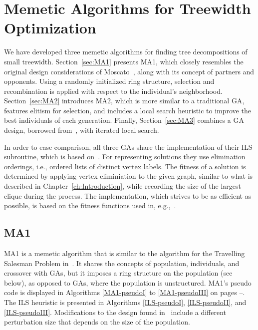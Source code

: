 \documentclass[thesis.tex]{subfiles}
\begin{document}
\chapter{Memetic Algorithms for Treewidth Optimization}
\label{ch:algorithms}
We have developed three memetic algorithms for finding tree decompositions of small treewidth. Section~\vref{sec:MA1} presents MA1, which closely resembles the original design considerations of Moscato~\parencite{moscato-1989}, along with its concept of partners and opponents. Using a randomly initialized ring structure, selection and recombination is applied with respect to the individual's neighborhood. Section~\vref{sec:MA2} introduces MA2, which is more similar to a traditional \gls{GA}, features elitism for selection, and includes a local search heuristic to improve the best individuals of each generation. Finally, Section~\vref{sec:MA3} combines a \gls{GA} design, borrowed from~\parencite{schafhauser-thesis,schafhauser-paper}, with iterated local search.

In order to ease comparison, all three \glspl{GA} share the implementation of their \gls{ILS} subroutine, which is based on~\parencite{musliu-2008-ILS}. For representing solutions they use elimination orderings, i.e., ordered lists of distinct vertex labels. The fitness of a solution is determined by applying vertex eliminiation to the given graph, similar to what is described in Chapter~\ref{ch:Introduction}, while recording the size of the largest clique during the process. The implementation, which strives to be as efficient as possible, is based on the fitness functions used in, e.g.,~\parencite{musliu-2008-ILS,hammerl-thesis,hammerl-paper}.



\section{MA1}  %
   \label{sec:MA1}
%
   \gls{MA1} is a memetic algorithm that is similar to the algorithm for the Travelling Salesman Problem in~\parencite{moscato-1989}. It shares the concepts of population, individuals, and crossover with \glspl{GA}, but it imposes a ring structure on the population (see below), as opposed to \glspl{GA}, where the population is unstructured. \gls{MA1}'s pseudo code is displayed in Algorithms \ref{MA1-pseudoI} to \ref{MA1-pseudoIII} on pages \pageref{MA1-pseudoI}--\pageref{MA1-pseudoIII}. The \gls{ILS} heuristic is presented in Algorithms \vref{ILS-pseudoI}, \vref{ILS-pseudoII}, and \vref{ILS-pseudoIII}. Modifications to the design found in~\parencite{musliu-2008-ILS} include a different perturbation size that depends on the size of the population.
\end{document}
